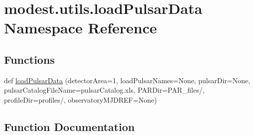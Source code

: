 \hypertarget{namespacemodest_1_1utils_1_1loadPulsarData}{}\section{modest.\+utils.\+load\+Pulsar\+Data Namespace Reference}
\label{namespacemodest_1_1utils_1_1loadPulsarData}
\subsection*{Functions}
\begin{DoxyCompactItemize}
\item 
def \hyperlink{namespacemodest_1_1utils_1_1loadPulsarData_abd266d46e56d28e83cb27a73f179bc4f}{load\+Pulsar\+Data} (detector\+Area=1, load\+Pulsar\+Names=None, pulsar\+Dir=None, pulsar\+Catalog\+File\+Name=\textquotesingle{}pulsar\+Catalog.\+xls\textquotesingle{}, P\+A\+R\+Dir=\textquotesingle{}P\+A\+R\+\_\+files/\textquotesingle{}, profile\+Dir=\textquotesingle{}profiles/\textquotesingle{}, observatory\+M\+J\+D\+R\+EF=None)
\end{DoxyCompactItemize}


\subsection{Function Documentation}
